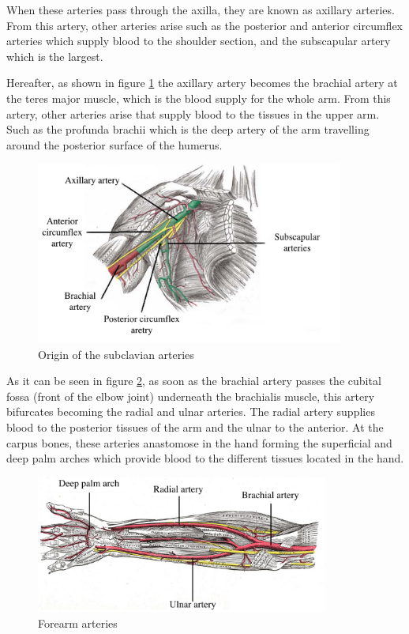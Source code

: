 When these arteries pass through the axilla, they are known as axillary arteries. From this artery, other arteries arise such as the posterior and anterior circumflex arteries which supply blood to the shoulder section, and the subscapular artery which is the largest. 

Hereafter, as shown in figure \ref{fig:upper arm circulation} the axillary artery becomes the brachial artery at the teres major muscle, which is the blood supply for the whole arm.  From this artery, other arteries arise that supply blood to the tissues in the upper arm. Such as the profunda brachii which is the deep artery of the arm travelling around the posterior surface of the humerus. 

\begin{figure}[!htpb]
	\centering
	\includegraphics[height=6cm,keepaspectratio]{figure19}
	\caption{Origin of the subclavian arteries}
	\label{fig:upper arm circulation}
\end{figure}

As it can be seen in figure \ref{fig:forearm aretries}, as soon as the brachial artery passes the cubital fossa (front of the elbow joint) underneath the brachialis muscle, this artery bifurcates becoming the radial and ulnar arteries. The radial artery supplies blood to the posterior tissues of the arm and the ulnar to the anterior. At the carpus bones, these arteries anastomose in the hand forming the superficial and deep palm arches which provide blood to the different tissues located in the hand. 

\begin{figure}[!htpb]
	\centering
	\includegraphics[height=4.5cm,keepaspectratio]{figure20}
	\caption{Forearm arteries}
	\label{fig:forearm aretries}
\end{figure}

